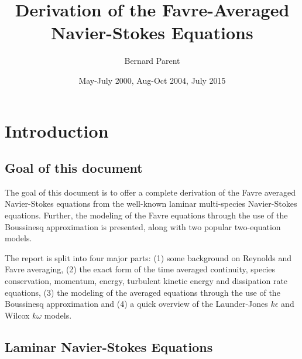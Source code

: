 \documentclass{warpdoc}
\author{
  Bernard Parent
}
\title{
  Derivation of the Favre-Averaged Navier-Stokes Equations 
}
\date{
  May-July 2000, Aug-Oct 2004, July 2015
}
\begin{document}
  \pagestyle{headings}
  \setcounter{page}{1}
  \makewarpdoctitle
  \tableofcontents











\section{Introduction}

\subsection{Goal of this document}

The goal of this document is to offer a complete derivation
of the Favre averaged Navier-Stokes equations from the
well-known laminar multi-species Navier-Stokes equations.
Further, the modeling of the Favre equations through the use
of the Boussinesq approximation is presented, along with two
popular two-equation models.

The report is split into four major parts: (1) some background
on Reynolds and Favre averaging, (2) the exact form of the
time averaged continuity, species conservation, momentum, energy, turbulent
kinetic energy and dissipation rate equations, (3) the modeling
of the averaged equations through the use of the Boussinesq
approximation and (4) a quick overview of the Launder-Jones
$k\epsilon$ and Wilcox $k\omega$ models.

\subsection{Laminar Navier-Stokes Equations}
\end{document}
